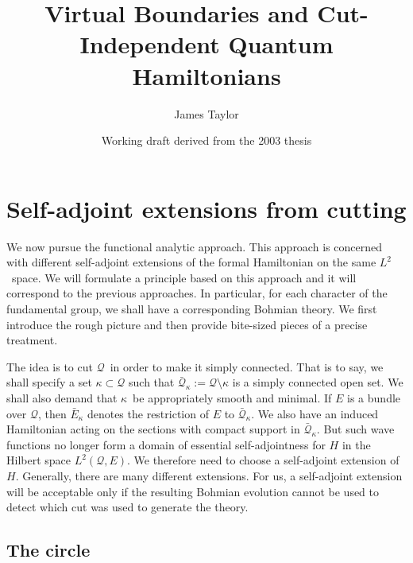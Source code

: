 \documentclass[11pt]{article}
\title{Virtual Boundaries and Cut-Independent Quantum Hamiltonians}
\author{James Taylor}
\date{Working draft derived from the 2003 thesis}
\theoremstyle{remark}
\begin{document}
\maketitle

\section{Self-adjoint extensions from cutting} \label{s:sa}


We now pursue the functional analytic approach. This approach is
concerned with different self-adjoint extensions of the formal
Hamiltonian on the same \ensuremath{L^{2}}\ space. We will formulate a principle
based on this approach and it will correspond to the previous approaches. In
particular, for each character of the fundamental group, we shall have
a corresponding Bohmian theory. 
We first introduce the rough picture and then provide bite-sized
pieces of a precise treatment.

The idea is to cut \ensuremath{\mathcal{Q}}\ in order to make it simply connected. That
is to say, we shall specify a set $\ensuremath{\kappa} \subset \ensuremath{\mathcal{Q}}$ such that $
\ensuremath{\bar{\ensuremath{\mathcal{Q}}}_{\ensuremath{\kappa}}} \ensuremath{:=} \ensuremath{\mathcal{Q}} \setminus \ensuremath{\kappa}$ is a simply connected open
set. We shall also demand that \ensuremath{\kappa}\ be appropriately smooth and
minimal. If $E$ is a bundle over \ensuremath{\mathcal{Q}}, then $\ensuremath{\bar{E}_{\ensuremath{\kappa}}}$ denotes the
restriction of  $E$ to $\ensuremath{\bar{\ensuremath{\mathcal{Q}}}_{\ensuremath{\kappa}}}$. 
We also have an induced Hamiltonian  acting on
the sections with compact support in \ensuremath{\bar{\ensuremath{\mathcal{Q}}}_{\ensuremath{\kappa}}}. But  such
wave functions no longer form a domain of essential self-adjointness for $H$ in the
Hilbert space $\ensuremath{L^{2}}(\ensuremath{\mathcal{Q}}, E)$. We
therefore need to choose a self-adjoint extension of $H$. 
Generally, there are many different extensions. 
For us, a self-adjoint extension will be acceptable only if 
the resulting Bohmian evolution cannot be used to detect which
cut was used to generate the theory. 


\subsection{The circle}
\end{document}
